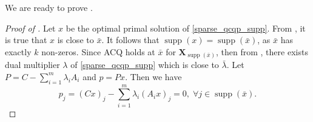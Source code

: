 \documentclass[11pt]{amsart}
\theoremstyle{plain}
\theoremstyle{definition}
\theoremstyle{remark}
\newcommand{\vX}{{\mathbf{X}}}
\DeclareMathOperator{\supp}{supp}
\begin{document}
    We are ready to prove .
	\begin{proof}[Proof of ]
		Let $x$ be the optimal primal solution of \eqref{sparse_qcqp_supp}. From , it is true that $x$ is close to $\bar x$. It follows that \(\supp(x)=\supp(\bar x)\), as $\bar x$ has exactly $k$ non-zeros.  Since ACQ holds at \(\bar x\) for $\vX_{\supp (\bar x)}$, then from , there exists dual multiplier $\lambda$ of \eqref{sparse_qcqp_supp} which is close to $\bar\lambda$. Let $P = C - \sum_{i=1}^m\lambda_iA_i$
	    and $ p =  P x$. Then we have
		\begin{equation}\label{eq:stability_first_order_condition}
			p_j=(Cx)_j - \sum_{i=1}^m\lambda_i(A_ix)_j=0,\;\forall j\in \supp(\bar x).
		\end{equation} 
        

\end{proof}
\end{document}
